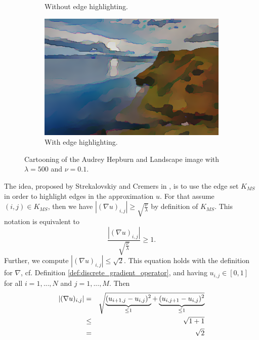 \documentclass[abstracton]{scrreprt}
\begin{document}
\begin{figure}[!ht]
\begin{subfigure}[b]{0.32\textwidth}
                    \caption{Without edge highlighting.}
                \end{subfigure}
                \begin{subfigure}[b]{0.32\textwidth}
                    \includegraphics[width=\textwidth]{img/cartooning/best_pwc_landscape_eh.png}
                    \caption{With edge highlighting.}
                \end{subfigure}
                \caption[Cartooning example of Audrey Hepburn and Landscape image.]{Cartooning of the Audrey Hepburn and Landscape image with $\lambda = 500$ and $\nu = 0.1$.}
            \label{fig:cartooning_hepburn_and_landscaperealtime}
            \end{figure}
            The idea, proposed by Strekalovskiy and Cremers in \cite{Strekalovskiy-Cremers-eccv14}, is to use the edge set $K_{MS}$ in order to highlight edges in the approximation $u$. For that assume $(i,j) \in K_{MS}$, then we have $|(\nabla u)_{i,j}| \ge \sqrt{\frac{\nu}{\lambda}}$ by definition of $K_{MS}$. This notation is equivalent to
                \begin{equation}
                    \frac{|(\nabla u)_{i,j}|}{\sqrt{\frac{\nu}{\lambda}}} \ge 1.
                    \label{eq:first_inequality}
                \end{equation}
            Further, we compute $|(\nabla u)_{i,j}| \le \sqrt{2}$. This equation holds with the definition for $\nabla$, cf. Definition \ref{def:discrete_gradient_operator}, and having $u_{i,j} \in [0, 1]$ for all $i = 1, ..., N$ and $j = 1, ..., M$. Then
                \begin{eqnarray}
                    |(\nabla u)_{i,j}| &=& \sqrt{\underbrace{(u_{i+1,j} - u_{i,j})^{2}}_{\le 1} + \underbrace{(u_{i,j+1} - u_{i,j})^{2}}_{\le 1}} \notag \\
                    &\le& \sqrt{1 + 1} \notag \\
                    &=& \sqrt{2} \notag
                \end{eqnarray}
\end{document}
